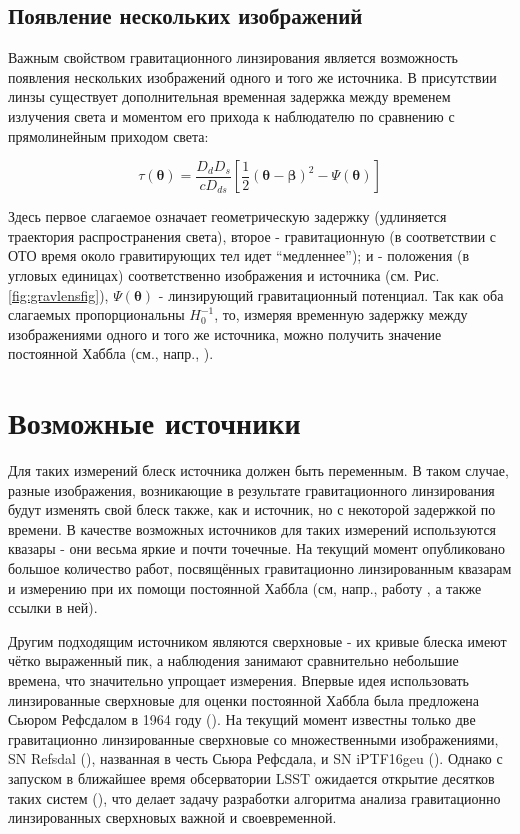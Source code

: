 \subsection{Появление нескольких изображений}

Важным свойством гравитационного линзирования является возможность появления нескольких изображений одного и того же источника. В присутствии линзы существует дополнительная временная задержка между временем излучения света и моментом его прихода к наблюдателю по сравнению с прямолинейным приходом света:

\begin{equation}
\tau(\boldsymbol{\theta})=\frac{D_{d} D_{s}}{c D_{d s}}\left[\frac{1}{2}(\boldsymbol{\theta}-\boldsymbol{\beta})^{2}-\Psi(\boldsymbol{\theta})\right]
\end{equation}

Здесь первое слагаемое означает геометрическую задержку (удлиняется траектория распространения света), второе - гравитационную (в соответствии с ОТО время около гравитирующих тел идет “медленнее”);  и  - положения (в угловых единицах) соответственно изображения и источника (см. Рис.\ref{fig:gravlensfig}), $\Psi(\boldsymbol{\theta})$ - линзирующий гравитационный потенциал. Так как оба слагаемых пропорциональны $H_0^{-1}$, то, измеряя временную задержку между изображениями одного и того же источника, можно получить значение постоянной Хаббла (см., напр., \cite{refsdal1964}).

\section{Возможные источники}

Для таких измерений блеск источника должен быть переменным. В таком случае, разные изображения, возникающие в результате гравитационного линзирования будут изменять свой блеск также, как и источник, но с некоторой задержкой по времени. В качестве возможных источников для таких измерений используются квазары - они весьма яркие и почти точечные. На текущий момент опубликовано большое количество работ, посвящённых гравитационно линзированным квазарам и измерению при их помощи постоянной Хаббла (см, напр., работу \cite{holicow}, а также ссылки в ней). 

Другим подходящим источником являются сверхновые - их кривые блеска имеют чётко выраженный пик, а наблюдения занимают сравнительно небольшие времена, что значительно упрощает измерения. Впервые идея использовать линзированные сверхновые для оценки постоянной Хаббла была предложена Сьюром Рефсдалом в 1964 году (\cite{refsdal1964}). На текущий момент известны только две гравитационно линзированные сверхновые со множественными изображениями, SN Refsdal (\cite{kelly2014}), названная в честь Сьюра Рефсдала, и SN iPTF16geu (\cite{goobar2017}). Однако с запуском в ближайшее время обсерватории LSST ожидается открытие десятков таких систем (\cite{pierelrodney2019}), что делает задачу разработки алгоритма анализа гравитационно линзированных сверхновых важной и своевременной.
